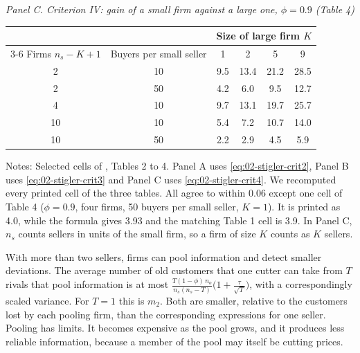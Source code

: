 \begin{table}[htbp]
\medskip
{\textit{Panel C. Criterion IV: gain of a small firm against a large one, $\phi = 0.9$ (Table 4)}}\par\smallskip
\begin{tabular}{@{}cccccc@{}}
\toprule
& & \multicolumn{4}{c}{Size of large firm $K$} \\
\cmidrule(l){3-6}
Firms $n_s - K + 1$ & Buyers per small seller & 1 & 2 & 5 & 9 \\
\midrule
2  & 10 & 9.5 & 13.4 & 21.2 & 28.5 \\
2  & 50 & 4.2 & 6.0  & 9.5  & 12.7 \\
4  & 10 & 9.7 & 13.1 & 19.7 & 25.7 \\
10 & 10 & 5.4 & 7.2  & 10.7 & 14.0 \\
10 & 50 & 2.2 & 2.9  & 4.5  & 5.9  \\
\bottomrule
\end{tabular}

\medskip
\begin{minipage}{0.94\linewidth}
\footnotesize
Notes: Selected cells of \citet{Stigler1964}, Tables 2 to 4. Panel A uses \eqref{eq:02-stigler-crit2}, Panel B
uses \eqref{eq:02-stigler-crit3} and Panel C uses \eqref{eq:02-stigler-crit4}. We recomputed every printed cell of
the three tables. All agree to within 0.06 except one cell of Table 4 ($\phi = 0.9$, four firms, 50 buyers per
small seller, $K = 1$). It is printed as 4.0, while the formula gives 3.93 and the matching Table 1 cell is 3.9. In
Panel C, $n_s$ counts sellers in units of the small firm, so a firm of size $K$ counts as $K$ sellers.
\end{minipage}
\end{table}

With more than two sellers, firms can pool information and detect smaller deviations. The average number of old
customers that one cutter can take from $T$ rivals that pool information is at most
$\frac{T(1 - \phi)\,n_o}{n_s(n_s - T)}\bigl(1 + \frac{\tau}{\sqrt{T}}\bigr)$, with a correspondingly scaled variance.
For $T = 1$ this is $m_2$.
Both are smaller, relative to the customers lost by each pooling firm, than the corresponding expressions for one
seller. Pooling has limits. It becomes expensive as the pool grows, and it produces less reliable information,
because a member of the pool may itself be cutting prices.


